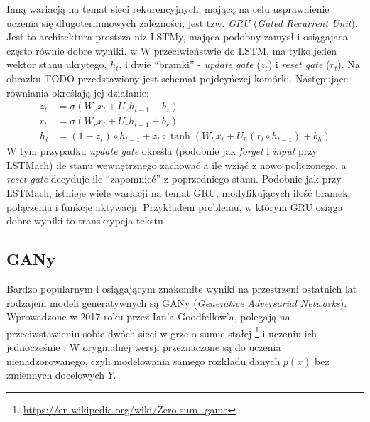 \documentclass[magisterska]{pracamgr}
\begin{document}
Inną wariacją na temat sieci rekurencyjnych, mającą na celu usprawnienie uczenia się długoterminowych zależności, jest tzw. \emph{GRU} (\textit{Gated Recurrent Unit}). Jest to architektura prostsza niz LSTMy, mająca podobny zamysł i osiągajaca często równie dobre wyniki. w W przeciwieństwie do LSTM, ma tylko jeden wektor stanu ukrytego, $h_t$, i dwie "`bramki"' - \textit{update gate} ($z_t$) i \textit{reset gate} ($r_t$). Na obrazku TODO przedstawiony jest schemat pojdeyńczej komórki. Następujące równiania określają jej działanie:
\begin{align*}
    z_t &= \sigma(W_z x_t + U_z h_{t-1} + b_z) \\
    r_t &= \sigma(W_r x_t + U_r h_{t-1} + b_r) \\
    h_t &= (1 - z_t) \circ h_{t-1} + z_t \circ \tanh(W_h x_t + U_h (r_t \circ h_{t-1}) + b_h)
\end{align*}
W tym przypadku \textit{update gate} określa (podobnie jak \textit{forget} i \textit{input} przy LSTMach) ile stanu wewnętrznego zachować a ile wziąć z nowo policzonego, a \textit{reset gate} decyduje ile "`zapomnieć"' z poprzedniego stanu. Podobnie jak przy LSTMach, istnieje wiele wariacji na temat GRU, modyfikujących ilość bramek, połączenia i funkcje aktywacji. Przykładem problemu, w którym GRU osiąga dobre wyniki to transkrypcja tekstu \cite{ravanelli2018gruspeech}.

\subsection{GANy}

Bardzo popularnym i osiągającym znakomite wyniki na przestrzeni ostatnich lat rodzajem modeli generatywnych są GANy (\textit{Generative Adversarial Networks}). Wprowadzone w 2017 roku przez Ian'a Goodfellow'a, polegają na przeciwstawieniu sobie dwóch sieci w grze o sumie stałej \footnote{\url{https://en.wikipedia.org/wiki/Zero-sum_game}} i uczeniu ich jednocześnie \cite{goodfellow2014gan}. W oryginalnej wersji przeznaczone są do uczenia nienadzorowanego, czyli modelowania samego rozkładu danych $p(x)$ bez zmiennych docelowych $Y$.
\end{document}
